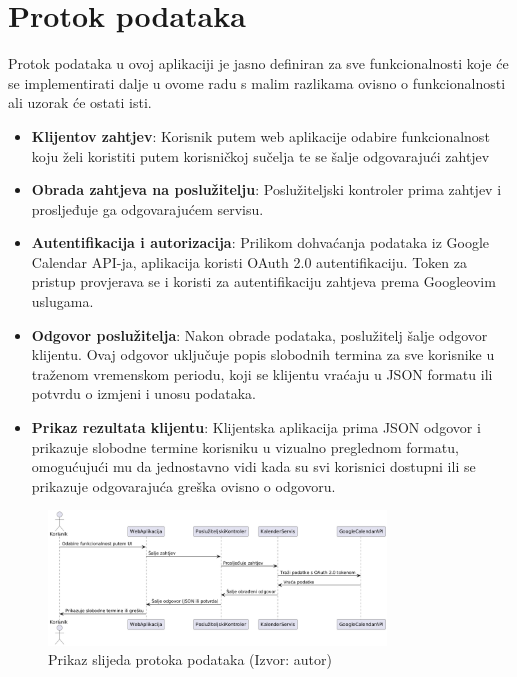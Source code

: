 \documentclass{foi}
\begin{document}
\section{Protok podataka}

Protok podataka u ovoj aplikaciji je jasno definiran za sve funkcionalnosti koje će se implementirati dalje u ovome radu s malim razlikama ovisno o funkcionalnosti ali uzorak će ostati isti.
\begin{itemize}
    \item \textbf{Klijentov zahtjev}: Korisnik putem web aplikacije odabire funkcionalnost koju želi koristiti putem korisničkoj sučelja te se šalje odgovarajući zahtjev
    \item \textbf{Obrada zahtjeva na poslužitelju}: Poslužiteljski kontroler prima zahtjev i prosljeđuje ga odgovarajućem servisu.
    \item \textbf{Autentifikacija i autorizacija}: Prilikom dohvaćanja podataka iz Google Calendar API-ja, aplikacija koristi OAuth 2.0 autentifikaciju. Token za pristup provjerava se i koristi za autentifikaciju zahtjeva prema Googleovim uslugama.
    \item \textbf{Odgovor poslužitelja}: Nakon obrade podataka, poslužitelj šalje odgovor klijentu. Ovaj odgovor uključuje popis slobodnih termina za sve korisnike u traženom vremenskom periodu, koji se klijentu vraćaju u JSON formatu ili potvrdu o izmjeni i unosu podataka.
    \item \textbf{Prikaz rezultata klijentu}: Klijentska aplikacija prima JSON odgovor i prikazuje slobodne termine korisniku u vizualno preglednom formatu, omogućujući mu da jednostavno vidi kada su svi korisnici dostupni ili se prikazuje odgovarajuća greška ovisno o odgovoru.
\end{itemize}
\begin{figure}[H]
    \centering
    \includegraphics[width=0.8\textwidth]{slike/protokPodataka.png}
    \caption{Prikaz slijeda protoka podataka  (Izvor: autor)}
    \label{fig:protokPodataka}
\end{figure}
\end{document}
